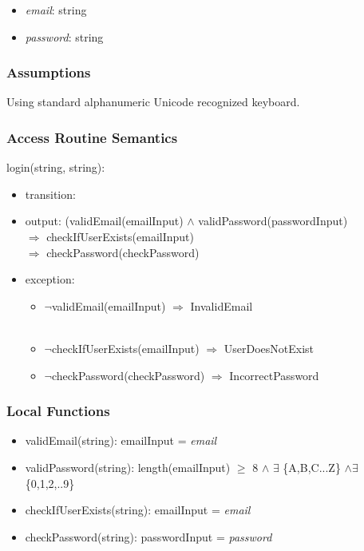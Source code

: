 \documentclass[12pt, titlepage]{article}
\begin{document}
\begin{itemize}
    \item \textit{email}: string
    \item \textit{password}: string
\end{itemize}

\subsubsection{Assumptions}

Using standard alphanumeric Unicode recognized keyboard.

\subsubsection{Access Routine Semantics}

\noindent login(string, string):
\begin{itemize}
\item transition:
\item output: (validEmail(emailInput) $\land$ validPassword(passwordInput)\ \\$\Rightarrow$ checkIfUserExists(emailInput) \\$\Rightarrow$ checkPassword(checkPassword)
\item exception: 
    \begin{itemize}
        \item[] $\neg$validEmail(emailInput) $\Rightarrow$ InvalidEmail\\\
        \item[] $\neg$checkIfUserExists(emailInput) $\Rightarrow$ UserDoesNotExist\\
        \item[] $\neg$checkPassword(checkPassword) $\Rightarrow$ IncorrectPassword\\
    \end{itemize}
\end{itemize}


\subsubsection{Local Functions}

\begin{itemize}
    \item validEmail(string): emailInput = \textit{email}
    \item validPassword(string): length(emailInput) $\ge$ 8 $\land$ $\exists$ \{A,B,C...Z\} $\land \exists$ \{0,1,2,..9\}
    \item checkIfUserExists(string): emailInput = \textit{email}
    \item checkPassword(string): passwordInput = \textit{password}
\end{itemize}
\end{document}
